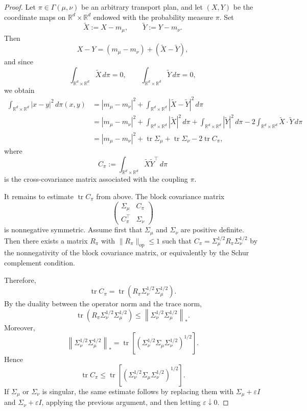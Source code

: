 \documentclass[10pt,a4paper]{amsart}
\newcommand{\bbr}{\mathbb R}
\newcommand{\dm}{d}
\begin{document}
\begin{proof}
Let $\pi\in\Gamma(\mu,\nu)$ be an arbitrary transport plan, and let $(X,Y)$ be the coordinate
maps on $\mathbb R^d\times\mathbb R^d$ endowed with the probability measure
$\pi$. Set
\[
\widetilde X:=X-m_\mu,
\qquad
\widetilde Y:=Y-m_\nu.
\]
Then
\[
X-Y=(m_\mu-m_\nu)+(\widetilde X-\widetilde Y),
\]
and since
\[
\int_{\bbr^d\times \bbr^d} \widetilde X\,d\pi=0,
\qquad
\int_{\bbr^d\times \bbr^d} \widetilde Y\,d\pi=0,
\]
we obtain
\[
\begin{aligned}
\int_{\mathbb R^{d}\times\bbr^\dm} |x-y|^2\,d\pi(x,y)
&=
|m_\mu-m_\nu|^2
+
\int_{\bbr^\dm\times\bbr^\dm} |\widetilde X-\widetilde Y|^2\,d\pi \\
&=
|m_\mu-m_\nu|^2
+
\int_{\bbr^\dm\times\bbr^\dm} |\widetilde X|^2\,d\pi
+
\int_{\bbr^\dm\times\bbr^\dm} |\widetilde Y|^2\,d\pi
-
2\int_{\bbr^\dm\times\bbr^\dm} \widetilde X\cdot\widetilde Y\,d\pi \\
&=
|m_\mu-m_\nu|^2
+
\operatorname{tr}\Sigma_\mu
+
\operatorname{tr}\Sigma_\nu
-
2\operatorname{tr}C_\pi,
\end{aligned}
\]
where
\[
C_\pi:=
\int_{\mathbb R^{d}\times\bbr^\dm}
\widetilde X\widetilde Y^\top\,d\pi
\]
is the cross-covariance matrix associated with the coupling $\pi$.

It remains to estimate $\operatorname{tr}C_\pi$ from above. The block covariance
matrix
\[
\begin{pmatrix}
\Sigma_\mu & C_\pi \\
C_\pi^\top & \Sigma_\nu
\end{pmatrix}
\]
is nonnegative symmetric. Assume first that \(\Sigma_\mu\) and \(\Sigma_\nu\) are positive definite. Then there exists a matrix $R_\pi$ with
$\|R_\pi\|_{\mathrm{op}}\le1$ such that $C_\pi=\Sigma_\mu^{1/2}R_\pi\Sigma_\nu^{1/2}$ by the nonnegativity of the block covariance matrix, or equivalently by the Schur complement condition.

Therefore,
\[
\operatorname{tr}C_\pi
=
\operatorname{tr}
\left(
R_\pi\Sigma_\nu^{1/2}\Sigma_\mu^{1/2}
\right).
\]
By the duality between the operator norm and the trace norm,
\[
\operatorname{tr}
\left(
R_\pi\Sigma_\nu^{1/2}\Sigma_\mu^{1/2}
\right)
\le
\left\|
\Sigma_\nu^{1/2}\Sigma_\mu^{1/2}
\right\|_*.
\]
Moreover,
\[
\left\|
\Sigma_\nu^{1/2}\Sigma_\mu^{1/2}
\right\|_*
=
\operatorname{tr}
\left[
\left(
\Sigma_\nu^{1/2}\Sigma_\mu\Sigma_\nu^{1/2}
\right)^{1/2}
\right].
\]
Hence
\[
\operatorname{tr}C_\pi
\le
\operatorname{tr}
\left[
\left(
\Sigma_\nu^{1/2}\Sigma_\mu\Sigma_\nu^{1/2}
\right)^{1/2}
\right].
\]
If $\Sigma_\mu$ or $\Sigma_\nu$ is singular, the same estimate follows by
replacing them with $\Sigma_\mu+\varepsilon I$ and
$\Sigma_\nu+\varepsilon I$, applying the previous argument, and then letting
$\varepsilon\downarrow0$.


\end{proof}
\end{document}
